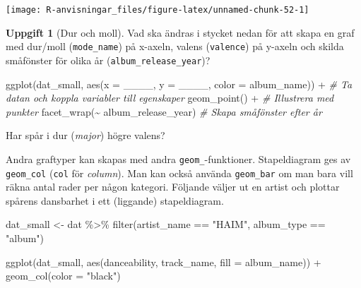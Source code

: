 \documentclass[
]{book}
\newenvironment{Shaded}{\begin{snugshade}}{\end{snugshade}}
\newcommand{\AttributeTok}[1]{\textcolor[rgb]{0.77,0.63,0.00}{#1}}
\newcommand{\CommentTok}[1]{\textcolor[rgb]{0.56,0.35,0.01}{\textit{#1}}}
\newcommand{\FunctionTok}[1]{\textcolor[rgb]{0.00,0.00,0.00}{#1}}
\newcommand{\NormalTok}[1]{#1}
\newcommand{\OtherTok}[1]{\textcolor[rgb]{0.56,0.35,0.01}{#1}}
\newcommand{\SpecialCharTok}[1]{\textcolor[rgb]{0.00,0.00,0.00}{#1}}
\newcommand{\StringTok}[1]{\textcolor[rgb]{0.31,0.60,0.02}{#1}}
\theoremstyle{definition}
\theoremstyle{definition}
\theoremstyle{definition}
\newtheorem{exercise}{Uppgift}[chapter]
\theoremstyle{definition}
\theoremstyle{remark}
\begin{document}
\begin{center}\texttt{[image: R-anvisningar\_files/figure-latex/unnamed-chunk-52-1]} \end{center}

\begin{exercise}[Dur och moll]
Vad ska ändras i stycket nedan för att skapa en graf med dur/moll (\texttt{mode\_name}) på x-axeln, valens (\texttt{valence}) på y-axeln och skilda småfönster för olika år (\texttt{album\_release\_year})?

\begin{Shaded}
\begin{Highlighting}[]
\FunctionTok{ggplot}\NormalTok{(dat\_small, }\FunctionTok{aes}\NormalTok{(}\AttributeTok{x =}\NormalTok{ \_\_\_\_, }\AttributeTok{y =}\NormalTok{ \_\_\_\_, }\AttributeTok{color =}\NormalTok{ album\_name)) }\SpecialCharTok{+} \CommentTok{\# Ta datan och koppla variabler till egenskaper}
  \FunctionTok{geom\_point}\NormalTok{() }\SpecialCharTok{+}                                                         \CommentTok{\# Illustrera med punkter}
  \FunctionTok{facet\_wrap}\NormalTok{(}\SpecialCharTok{\textasciitilde{}}\NormalTok{ album\_release\_year)                                       }\CommentTok{\# Skapa småfönster efter år}
\end{Highlighting}
\end{Shaded}

Har spår i dur (\emph{major}) högre valens?
\end{exercise}

Andra graftyper kan skapas med andra \texttt{geom\_}-funktioner. Stapeldiagram ges av \texttt{geom\_col} (\texttt{col} för \emph{column}). Man kan också använda \texttt{geom\_bar} om man bara vill räkna antal rader per någon kategori.
Följande väljer ut en artist och plottar spårens dansbarhet i ett (liggande) stapeldiagram.

\begin{Shaded}
\begin{Highlighting}[]
\NormalTok{dat\_small }\OtherTok{\textless{}{-}}\NormalTok{ dat }\SpecialCharTok{\%\textgreater{}\%} 
  \FunctionTok{filter}\NormalTok{(artist\_name }\SpecialCharTok{==} \StringTok{"HAIM"}\NormalTok{, album\_type }\SpecialCharTok{==} \StringTok{"album"}\NormalTok{)}

\FunctionTok{ggplot}\NormalTok{(dat\_small, }\FunctionTok{aes}\NormalTok{(danceability, track\_name, }\AttributeTok{fill =}\NormalTok{ album\_name)) }\SpecialCharTok{+}
  \FunctionTok{geom\_col}\NormalTok{(}\AttributeTok{color =} \StringTok{"black"}\NormalTok{)}
\end{Highlighting}
\end{Shaded}
\end{document}
